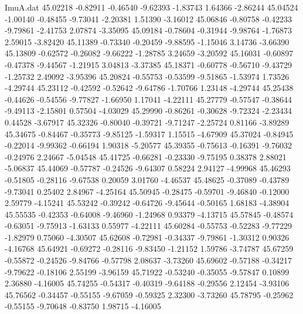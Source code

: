 \begin{filecontents}{ImuA.dat}
  45.02218   -0.82911   -0.46540   -9.62393   -1.83743    1.64366   -2.86244
  45.04524   -1.00140   -0.48455   -9.73041   -2.20381    1.51390   -3.16012
  45.06846   -0.80758   -0.42233   -9.79861   -2.41753    2.07874   -3.35095
  45.09184   -0.78604   -0.31944   -9.98764   -1.76873    2.59015   -3.82420
  45.11389   -0.73340   -0.20459   -9.88595   -1.15046    3.14736   -3.66390
  45.13809   -0.62572   -0.26082   -9.66222   -1.28785    3.24659   -3.20592
  45.16031   -0.60897   -0.47378   -9.44567   -1.21915    3.04813   -3.37385
  45.18371   -0.60778   -0.56710   -9.43729   -1.25732    2.49092   -3.95396
  45.20824   -0.55753   -0.53599   -9.51865   -1.53974    1.73526   -4.29744
  45.23112   -0.42592   -0.52642   -9.64786   -1.70766    1.23148   -4.29744
  45.25438   -0.44626   -0.54556   -9.77827   -1.66950    1.17041   -4.22111
  45.27779   -0.57547   -0.38644   -9.49113   -2.15801    0.57504   -4.03029
  45.29990   -0.86261   -0.30628   -9.72324   -2.23434    0.44528   -3.67917
  45.32326   -0.80040   -0.39721   -9.71247   -2.25724    0.81166   -3.89289
  45.34675   -0.84467   -0.35773   -9.85125   -1.59317    1.15515   -4.67909
  45.37024   -0.84945   -0.22014   -9.99362   -0.66194    1.90318   -5.20577
  45.39355   -0.75613   -0.16391   -9.76032   -0.24976    2.24667   -5.04548
  45.41725   -0.66281   -0.23330   -9.75195    0.38378    2.88021   -5.06837
  45.44069   -0.57787   -0.24526   -9.64307    0.58224    2.94127   -4.99968
  45.46293   -0.51805   -0.28116   -9.67538    0.20059    3.01760   -4.46537
  45.48625   -0.37089   -0.43789   -9.73041    0.25402    2.84967   -4.25164
  45.50945   -0.28475   -0.59701   -9.46840   -0.12000    2.59779   -4.15241
  45.53242   -0.39242   -0.64726   -9.45644   -0.50165    1.68183   -4.38904
  45.55535   -0.42353   -0.64008   -9.46960   -1.24968    0.93379   -4.13715
  45.57845   -0.48574   -0.63051   -9.75913   -1.63133    0.55977   -4.22111
  45.60284   -0.55753   -0.52283   -9.77229   -1.82979    0.75060   -4.30507
  45.62608   -0.72981   -0.34337   -9.79861   -1.30312    0.90326   -4.16768
  45.64921   -0.69272   -0.28116   -9.83450   -1.21152    1.59786   -3.74787
  45.67259   -0.55872   -0.24526   -9.84766   -0.57798    2.08637   -3.73260
  45.69602   -0.57188   -0.34217   -9.79622   -0.18106    2.55199   -3.96159
  45.71922   -0.53240   -0.35055   -9.57847    0.10899    2.36880   -4.16005
  45.74255   -0.54317   -0.40319   -9.64188   -0.29556    2.12454   -3.93106
  45.76562   -0.34457   -0.55155   -9.67059   -0.59325    2.32300   -3.73260
  45.78795   -0.25962   -0.55155   -9.70648   -0.83750    1.98715   -4.16005

\end{filecontents}
